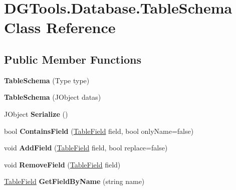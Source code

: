 \hypertarget{class_d_g_tools_1_1_database_1_1_table_schema}{}\section{D\+G\+Tools.\+Database.\+Table\+Schema Class Reference}
\label{class_d_g_tools_1_1_database_1_1_table_schema}
\subsection*{Public Member Functions}
\begin{DoxyCompactItemize}
\item 
\mbox{\label{class_d_g_tools_1_1_database_1_1_table_schema_a5046105403da228be07add6cfe798853}} 
{\bfseries Table\+Schema} (Type type)
\item 
\mbox{\label{class_d_g_tools_1_1_database_1_1_table_schema_aae41593447a8c105efd4e83719ddb5ca}} 
{\bfseries Table\+Schema} (J\+Object datas)
\item 
\mbox{\label{class_d_g_tools_1_1_database_1_1_table_schema_a036e38cef0dc33d49227dcdf79d07a0f}} 
J\+Object {\bfseries Serialize} ()
\item 
\mbox{\label{class_d_g_tools_1_1_database_1_1_table_schema_a290c495c8df810f8d5105397f6a127d7}} 
bool {\bfseries Contains\+Field} (\mbox{\hyperlink{class_d_g_tools_1_1_database_1_1_table_field}{Table\+Field}} field, bool only\+Name=false)
\item 
\mbox{\label{class_d_g_tools_1_1_database_1_1_table_schema_a852b3345ca7f0685ee319af07f96bdbf}} 
void {\bfseries Add\+Field} (\mbox{\hyperlink{class_d_g_tools_1_1_database_1_1_table_field}{Table\+Field}} field, bool replace=false)
\item 
\mbox{\label{class_d_g_tools_1_1_database_1_1_table_schema_a9a1ee1bcc387b174a3a13a4d66c026a1}} 
void {\bfseries Remove\+Field} (\mbox{\hyperlink{class_d_g_tools_1_1_database_1_1_table_field}{Table\+Field}} field)
\item 
\mbox{\label{class_d_g_tools_1_1_database_1_1_table_schema_ae0534e9be6b9c3c8af292628b41ff48f}} 
\mbox{\hyperlink{class_d_g_tools_1_1_database_1_1_table_field}{Table\+Field}} {\bfseries Get\+Field\+By\+Name} (string name)
\end{DoxyCompactItemize}
